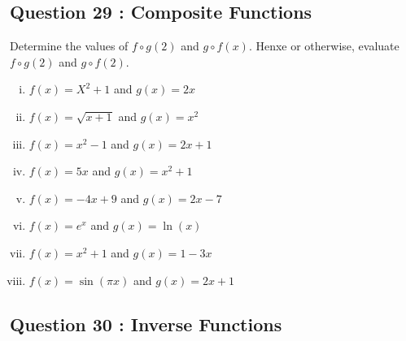 \documentclass[]{article}
\begin{document}
\subsection*{Question 29 : Composite Functions}
Determine the values of $f \circ g(2)$ and $g \circ f(x)$. Henxe or otherwise, evaluate $f \circ g(2)$ and $g \circ f(2)$.
\begin{multicols}{2}
	\begin{enumerate}[(i)]
	\item $f(x) = X^2 + 1$ and $g(x)= 2x$
		\item $f(x) = \sqrt{x+1}$ and $g(x)=x^2$
		\item $f(x) = x^2-1$ and $g(x) = 2x+1$
		
				\item $f(x) = 5x $ and $g(x)=x^2+1$
	\item $f(x) = -4x+9$ and $g(x) = 2x-7$
						\item $f(x) = e^x$ and $g(x)=\ln(x)$
						\item  $f(x) = x^2+1$ and $g(x) = 1-3x$
						\item $f(x) = \sin(\pi x)$ and $g(x) = 2x+1$
	\end{enumerate}	
\end{multicols}	
\medskip

\subsection*{Question 30 : Inverse Functions}
\end{document}

